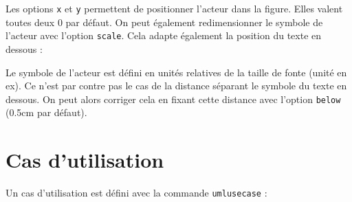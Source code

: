 \documentclass[a4paper,11pt]{report}
\newcommand{\inputTikZ}[1]{%
  }%
\newcommand{\inputTikZ}[1]{%
    \texttt{[image: fig/\#1.pdf]}%
  }%
\begin{document}
\medskip

Les options {\tt x} et {\tt y} permettent de positionner l'acteur dans la figure. Elles valent toutes deux 0 par défaut. On peut également redimensionner le symbole de l'acteur avec l'option {\tt scale}. Cela adapte également la position du texte en dessous :

\medskip

\begin{minipage}{0.5\textwidth}

\end{minipage}
\begin{minipage}{0.5\textwidth}
\begin{center}
\inputTikZ{figure43}
\end{center}
\end{minipage}

\medskip

Le symbole de l'acteur est défini en unités relatives de la taille de fonte (unité en ex). Ce n'est par contre pas le cas de la distance séparant le symbole du texte en dessous. On peut alors corriger cela en fixant cette distance avec l'option {\tt below} (0.5cm par défaut).

\medskip
 
\begin{minipage}{0.5\textwidth}

\end{minipage}
\begin{minipage}{0.5\textwidth}
\begin{center}
\inputTikZ{figure44}
\end{center}
\end{minipage}

\section{Cas d'utilisation}\label{s.usecase}

Un cas d'utilisation est défini avec la commande {\tt umlusecase} :

\medskip

\begin{minipage}{0.5\textwidth}

\end{minipage}
\begin{minipage}{0.5\textwidth}
\begin{center}
\inputTikZ{figure45}
\end{center}
\end{minipage}
\end{document}
